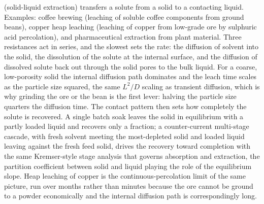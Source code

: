  (solid-liquid extraction) transfers a solute
from a solid to a contacting liquid. Examples: coffee brewing
(leaching of soluble coffee components from ground beans), copper
heap leaching (leaching of copper from low-grade ore by sulphuric
acid percolation), and pharmaceutical extraction from plant material.
Three resistances act in series, and the slowest sets the rate: the
diffusion of solvent into the solid, the dissolution of the solute at
the internal surface, and the diffusion of dissolved solute back out
through the solid pores to the bulk liquid. For a coarse, low-porosity
solid the internal diffusion path dominates and the leach time scales as
the particle size squared, the same $L^2/D$ scaling as transient
diffusion, which is why grinding the ore or the bean is the first lever:
halving the particle size quarters the diffusion time. The contact
pattern then sets how completely the solute is recovered. A single batch
soak leaves the solid in equilibrium with a partly loaded liquid and
recovers only a fraction; a counter-current multi-stage cascade, with
fresh solvent meeting the most-depleted solid and loaded liquid leaving
against the fresh feed solid, drives the recovery toward completion with
the same Kremser-style stage analysis that governs absorption and
extraction, the partition coefficient between solid and liquid playing
the role of the equilibrium slope. Heap leaching of copper is the
continuous-percolation limit of the same picture, run over months rather
than minutes because the ore cannot be ground to a powder economically
and the internal diffusion path is correspondingly long.


